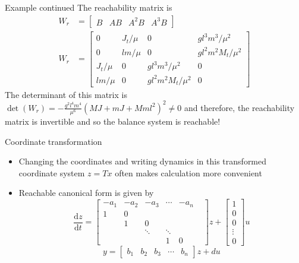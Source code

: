 \documentclass[10pt]{beamer-control}
\begin{document}
\begin{frame}{Example continued}
  The reachability matrix is
  \begin{align}
    W_r&= \begin{bmatrix}
      B & AB & A^2 B & A^3B
    \end{bmatrix} \\
    W_r &= \begin{bmatrix}
      0 & J_t/\mu & 0 & gl^3m^3/\mu^2 \\
      0 & lm/\mu & 0 & gl^2m^2M_t/\mu^2 \\
      J_t/\mu & 0 & gl^3m^3/\mu^2 & 0 \\
      lm/\mu & 0 & gl^2m^2M_t/\mu^2 & 0
    \end{bmatrix}
  \end{align}
  The determinant of this matrix is $\operatorname{det}(W_r)=-\frac{g^2l^4m^4}{\mu^6}(MJ+mJ+Mml^2)^2\neq 0$ and therefore, the reachability matrix is invertible and so the balance system is reachable!
\end{frame}


\begin{frame}{Coordinate transformation}
  \begin{itemize}
    \item Changing the coordinates and writing dynamics in this transformed coordinate system $z=Tx$ often makes calculation more convenient
    \item Reachable canonical form is given by
      \begin{equation}
        \frac{\mathrm{d}z}{\mathrm{d}t} = \begin{bmatrix}
          -a_1 & -a_2 & -a_3 &  \cdots & -a_n  \\
          1 & 0 & & & \\
          & 1& 0 & & & \\
          & & \ddots & \ddots  & \\
          & & & 1 & 0
        \end{bmatrix}z + \begin{bmatrix}
          1 \\ 0 \\ 0 \\ \vdots \\ 0
        \end{bmatrix} u
      \end{equation}
      \begin{equation}
        y=\begin{bmatrix}
          b_1 & b_2 & b_3 & \cdots & b_n
        \end{bmatrix}z + du
      \end{equation}
  \end{itemize}
\end{frame}
\end{document}
